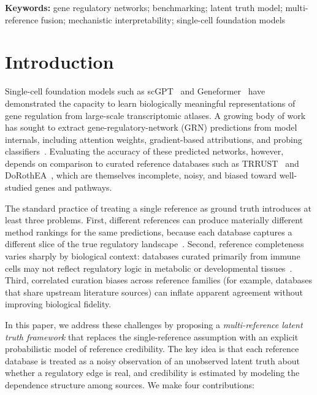 \documentclass[11pt,a4paper]{article}
\begin{document}
\noindent\textbf{Keywords:} gene regulatory networks; benchmarking; latent truth model; multi-reference fusion; mechanistic interpretability; single-cell foundation models

\section{Introduction}\label{sec:intro}

Single-cell foundation models such as scGPT~\citep{cui2024scgpt} and Geneformer~\citep{theodoris2023transfer} have demonstrated the capacity to learn biologically meaningful representations of gene regulation from large-scale transcriptomic atlases.
A growing body of work has sought to extract gene-regulatory-network (GRN) predictions from model internals, including attention weights, gradient-based attributions, and probing classifiers~\citep{hao2024large}.
Evaluating the accuracy of these predicted networks, however, depends on comparison to curated reference databases such as TRRUST~\citep{han2018trrust} and DoRothEA~\citep{garcia2019benchmark}, which are themselves incomplete, noisy, and biased toward well-studied genes and pathways.

The standard practice of treating a single reference as ground truth introduces at least three problems.
First, different references can produce materially different method rankings for the same predictions, because each database captures a different slice of the true regulatory landscape~\citep{pratapa2020benchmarking}.
Second, reference completeness varies sharply by biological context: databases curated primarily from immune cells may not reflect regulatory logic in metabolic or developmental tissues~\citep{schiebinger2019optimal, kamimoto2023dissecting}.
Third, correlated curation biases across reference families (for example, databases that share upstream literature sources) can inflate apparent agreement without improving biological fidelity.

In this paper, we address these challenges by proposing a \emph{multi-reference latent truth framework} that replaces the single-reference assumption with an explicit probabilistic model of reference credibility.
The key idea is that each reference database is treated as a noisy observation of an unobserved latent truth about whether a regulatory edge is real, and credibility is estimated by modeling the dependence structure among sources.
We make four contributions:
\end{document}
